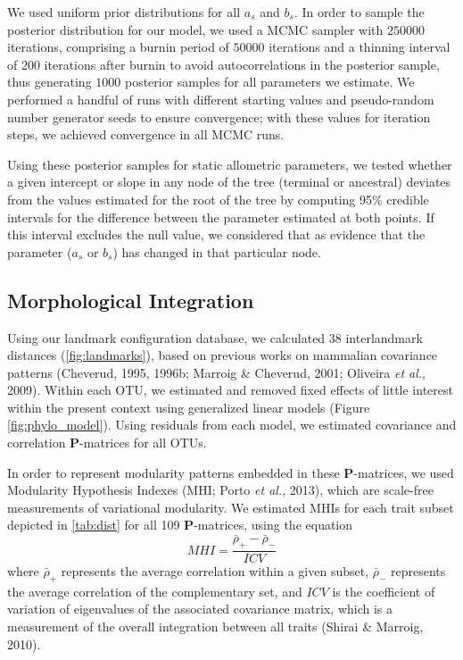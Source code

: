 \documentclass[12pt,twoside]{report}
\begin{document}
We used uniform prior distributions for all $a_s$ and $b_s$. In order to
sample the posterior distribution for our model, we used a MCMC sampler
with $250000$ iterations, comprising a burnin period of $50000$
iterations and a thinning interval of $200$ iterations after burnin to
avoid autocorrelations in the posterior sample, thus generating $1000$
posterior samples for all parameters we estimate. We performed a handful
of runs with different starting values and pseudo-random number
generator seeds to ensure convergence; with these values for iteration
steps, we achieved convergence in all MCMC runs.

Using these posterior samples for static allometric parameters, we
tested whether a given intercept or slope in any node of the tree
(terminal or ancestral) deviates from the values estimated for the root
of the tree by computing 95\% credible intervals for the difference
between the parameter estimated at both points. If this interval
excludes the null value, we considered that as evidence that the
parameter ($a_s$ or $b_s$) has changed in that particular node.

\subsection{Morphological Integration}\label{morphological-integration}

Using our landmark configuration database, we calculated 38
interlandmark distances (\autoref{fig:landmarks}), based on previous
works on mammalian covariance patterns (Cheverud, 1995, 1996b; Marroig
\& Cheverud, 2001; Oliveira \emph{et al.}, 2009). Within each OTU, we
estimated and removed fixed effects of little interest within the
present context using generalized linear models (Figure
\ref{fig:phylo_model}). Using residuals from each model, we estimated
covariance and correlation $\mathbf{P}$-matrices for all OTUs.

In order to represent modularity patterns embedded in these
$\mathbf{P}$-matrices, we used Modularity Hypothesis Indexes (MHI; Porto
\emph{et al.}, 2013), which are scale-free measurements of variational
modularity. We estimated MHIs for each trait subset depicted in
\autoref{tab:dist} for all 109 $\mathbf{P}$-matrices, using the equation
\[
MHI = \frac {\bar{\rho}_{+} - \bar{\rho}_{-}} {ICV}
\] where $\bar{\rho}_{+}$ represents the average correlation within a
given subset, $\bar{\rho}_{-}$ represents the average correlation of the
complementary set, and $ICV$ is the coefficient of variation of
eigenvalues of the associated covariance matrix, which is a measurement
of the overall integration between all traits (Shirai \& Marroig, 2010).
\end{document}
